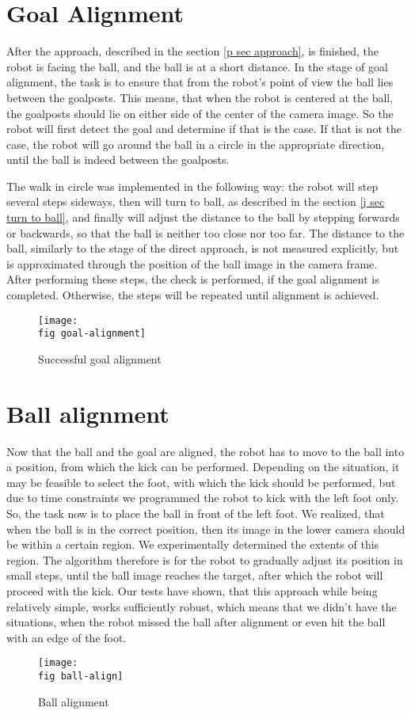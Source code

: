 \section{Goal Alignment}

After the approach, described in the section \ref{p sec approach}, is finished,
the robot is facing the ball, and the ball is at a short distance. In the stage
of goal alignment, the task is to ensure that from the robot's point of view
the ball lies between the goalposts. This means, that when the robot is
centered at the ball, the goalposts should lie on either side of the center of
the camera image. So the robot will first detect the goal and determine if that
is the case. If that is not the case, the robot will go around the ball in a
circle in the appropriate direction, until the ball is indeed between the
goalposts.

The walk in circle was implemented in the following way: the robot will step
several steps sideways, then will turn to ball, as described in the section
\ref{j sec turn to ball}, and finally will adjust the distance to the ball by
stepping forwards or backwards, so that the ball is neither too close nor too
far. The distance to the ball, similarly to the stage of the direct approach,
is not measured explicitly, but is approximated through the position of the
ball image in the camera frame. After performing these steps, the check is
performed, if the goal alignment is completed. Otherwise, the steps will be
repeated until alignment is achieved.

\begin{figure}[ht]
  \texttt{[image: \\fig goal-alignment]}
  \caption{Successful goal alignment}
  \label{p figure goal-alignment}
\end{figure}

\section{Ball alignment}

Now that the ball and the goal are aligned, the robot has to move to the ball
into a position, from which the kick can be performed. Depending on the
situation, it may be feasible to select the foot, with which the kick should be
performed, but due to time constraints we programmed the robot to kick with the
left foot only. So, the task now is to place the ball in front of the left
foot. We realized, that when the ball is in the correct position, then its
image in the lower camera should be within a certain region. We experimentally
determined the extents of this region. The algorithm therefore is for the robot
to gradually adjust its position in small steps, until the ball image reaches
the target, after which the robot will proceed with the kick. Our tests have
shown, that this approach while being relatively simple, works sufficiently
robust, which means that we didn't have the situations, when the robot missed
the ball after alignment or even hit the ball with an edge of the foot.

\begin{figure}[ht]
  \texttt{[image: \\fig ball-align]}
  \caption{Ball alignment}
  \label{p figure ball-alignment}
\end{figure}
